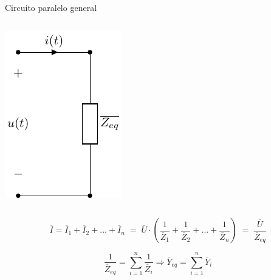 \documentclass[aspectratio=169, usenames,svgnames,dvipsnames]{beamer}
\begin{document}
\begin{frame}[label={sec:orga0dcc78}]{Circuito paralelo general}
\begin{columns}
\begin{column}{0.2\columnwidth}
\begin{center}
\begin{center}
\includegraphics[width=.9\linewidth]{../figs/paralelo_general_eq.pdf}
\end{center}
\end{center}
\end{column}
\end{columns}


\[\overline{I} = \overline{I}_1+\overline{I}_2+...+\overline{I}_n \; = \; \overline{U} \cdot\left(\dfrac{1}{\overline{Z}_1}+\dfrac{1}{\overline{Z}_2}+...+\dfrac{1}{\overline{Z}_n}\right) \; = \; \dfrac{\overline{U}}{\overline{Z}_{eq}}\]

\[
  \boxed{\dfrac{1}{\overline{Z}_{eq}}=\sum_{i=1}^n \dfrac{1}{\overline{Z}_i}}%
  \Rightarrow%
  \boxed{\overline{Y}_{eq}=\sum_{i=1}^n \overline{Y}_i}
\]
\end{frame}
\end{document}
